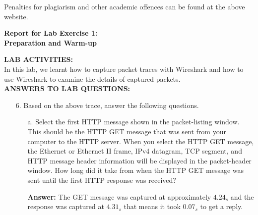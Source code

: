 \documentclass[12pt,letterpaper]{article}
\begin{document}
Penalties for plagiarism and other academic offences can be found at the above website.



\newpage
\begin{center}
    \Large \bf Report for Lab Exercise 1:\\Preparation and Warm-up \vspace*{12pt}
\end{center}


{\bf LAB ACTIVITIES:}
\\

In this lab, we learnt how to capture packet traces with Wireshark and how to use Wireshark to examine
the details of captured packets.
\\

{\bf ANSWERS TO LAB QUESTIONS:}

\begin{enumerate}
    \item[6.] Based on the above trace, answer the following questions.
    \begin{enumerate}
        \item[a.] Select the first HTTP message shown in the packet-listing window. This should be the HTTP GET
message that was sent from your computer to the HTTP server. When you select the HTTP GET
message, the Ethernet or Ethernet II frame, IPv4 datagram, TCP segment, and HTTP message
header information will be displayed in the packet-header window. How long did it take from
when the HTTP GET message was sent until the first HTTP response was received?

        {\bf Answer:} The GET message was captured at approximately $4.24_s$ and the response was captured at $4.31_s$ that means it took $0.07_s$ to get a reply.
    \end{enumerate}
\end{enumerate}

\end{document}
